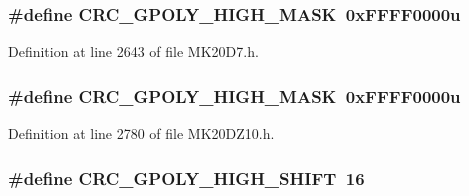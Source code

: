 \subsubsection[{\texorpdfstring{C\+R\+C\+\_\+\+G\+P\+O\+L\+Y\+\_\+\+H\+I\+G\+H\+\_\+\+M\+A\+SK}{CRC_GPOLY_HIGH_MASK}}]{\setlength{\rightskip}{0pt plus 5cm}\#define C\+R\+C\+\_\+\+G\+P\+O\+L\+Y\+\_\+\+H\+I\+G\+H\+\_\+\+M\+A\+SK~0x\+F\+F\+F\+F0000u}\hypertarget{group___c_r_c___register___masks_ga96c07e55f3d3c43d7b3e7637bc854ed6}{}\label{group___c_r_c___register___masks_ga96c07e55f3d3c43d7b3e7637bc854ed6}


Definition at line 2643 of file M\+K20\+D7.\+h.

\subsubsection[{\texorpdfstring{C\+R\+C\+\_\+\+G\+P\+O\+L\+Y\+\_\+\+H\+I\+G\+H\+\_\+\+M\+A\+SK}{CRC_GPOLY_HIGH_MASK}}]{\setlength{\rightskip}{0pt plus 5cm}\#define C\+R\+C\+\_\+\+G\+P\+O\+L\+Y\+\_\+\+H\+I\+G\+H\+\_\+\+M\+A\+SK~0x\+F\+F\+F\+F0000u}\hypertarget{group___c_r_c___register___masks_ga96c07e55f3d3c43d7b3e7637bc854ed6}{}\label{group___c_r_c___register___masks_ga96c07e55f3d3c43d7b3e7637bc854ed6}


Definition at line 2780 of file M\+K20\+D\+Z10.\+h.

\subsubsection[{\texorpdfstring{C\+R\+C\+\_\+\+G\+P\+O\+L\+Y\+\_\+\+H\+I\+G\+H\+\_\+\+S\+H\+I\+FT}{CRC_GPOLY_HIGH_SHIFT}}]{\setlength{\rightskip}{0pt plus 5cm}\#define C\+R\+C\+\_\+\+G\+P\+O\+L\+Y\+\_\+\+H\+I\+G\+H\+\_\+\+S\+H\+I\+FT~16}\hypertarget{group___c_r_c___register___masks_ga991debc471e54dcf5297d6a42c5778e6}{}\label{group___c_r_c___register___masks_ga991debc471e54dcf5297d6a42c5778e6}


